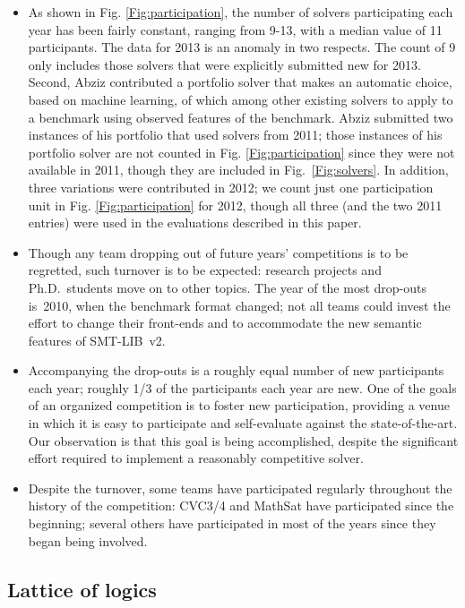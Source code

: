 \documentclass{eptcs}
\begin{document}
\begin{itemize}
\item As shown in Fig. \ref{Fig:participation}, the number of solvers participating each year has been fairly constant, ranging
from 9-13, with a median value of 11 participants. The data for 2013 is an anomaly in two respects. The count of 9 only includes those solvers that were explicitly submitted new for 2013. Second, Abziz contributed a portfolio solver that makes an automatic choice, based on machine learning, of which among other existing solvers to apply to a benchmark using observed features of the benchmark. Abziz submitted two instances of his portfolio that used solvers from 2011; those instances of his portfolio solver are not counted in 
Fig. \ref{Fig:participation} since they were not available in 2011, though they are included in Fig.~\ref{Fig:solvers}. In addition, three variations were contributed in 2012; we count just one participation unit in 
Fig. \ref{Fig:participation} for 2012, though all three (and the two 2011 entries) were used in the evaluations described in this paper.

\item Though any team dropping out of future years' competitions is to be regretted, such turnover is to be expected: research projects and Ph.D.\ students move on to other topics. The year of the most drop-outs is~2010, when the benchmark format changed; not all teams could invest the effort to change their front-ends and to accommodate the new semantic features of SMT-LIB~v2. 
\item Accompanying the drop-outs is a roughly equal number of new participants each year; roughly 1/3 of the participants each year are new. One of the goals of an organized competition is to foster new participation, providing a venue in which it is easy to participate and self-evaluate against the state-of-the-art. Our observation is that this goal is being accomplished, despite the significant effort required to implement a reasonably competitive solver. 
\item Despite the turnover, some teams have participated regularly throughout the history of the competition: CVC3/4 and MathSat have participated since the beginning; several others have participated in most of the years since they began being involved.
\end{itemize}



\subsection{Lattice of logics}
\label{Lattice}
\end{document}
